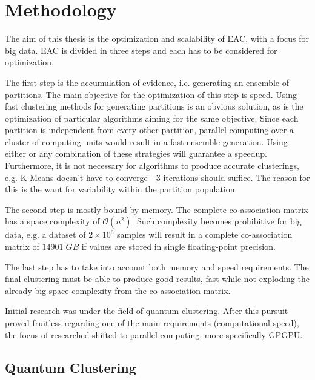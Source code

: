 
\chapter{Methodology}
\label{chapter:methodology}




The aim of this thesis is the optimization and scalability of EAC, with a focus for big data. EAC is divided in three steps and each has to be considered for optimization.

The first step is the accumulation of evidence, i.e. generating an ensemble of partitions. The main objective for the optimization of this step is speed. Using fast clustering methods for generating partitions is an obvious solution, as is the optimization of particular algorithms aiming for the same objective. Since each partition is independent from every other partition, parallel computing over a cluster of computing units would result in a fast ensemble generation. Using either or any combination of these strategies will guarantee a speedup. Furthermore, it is not necessary for algorithms to produce accurate clusterings, e.g. K-Means doesn't have to converge - 3 iterations should suffice. The reason for this is the want for variability within the partition population.
	
The second step is mostly bound by memory. The complete co-association matrix has a space complexity of $\mathcal{O}(n^2)$. Such complexity becomes prohibitive for big data, e.g. a dataset of $2 \times 10^6$ samples will result in a complete co-association matrix of $14901 \; GB$ if values are stored in single floating-point precision.

The last step has to take into account both memory and speed requirements. The final clustering must be able to produce good results, fast while not exploding the already big space complexity from the co-association matrix.

Initial research was under the field of quantum clustering. After this pursuit proved fruitless regarding one of the main requirements (computational speed), the focus of researched shifted to parallel computing, more specifically GPGPU. 

\section{Quantum Clustering}

